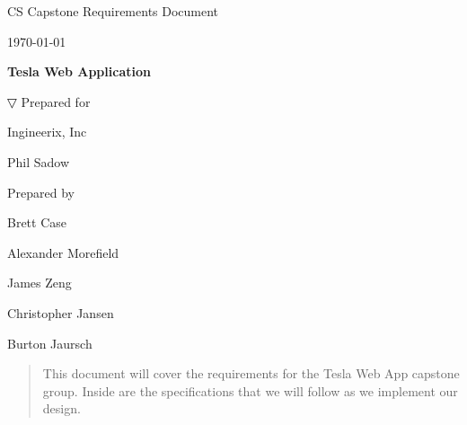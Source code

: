 \documentclass[onecolumn, draftclsnofoot,10pt, compsoc]{IEEEtran}
\def \CapstoneTeamName{                 The Ingineers}
\def \CapstoneTeamNumber{               22}
\def \GroupMemberOne{                   Brett Case}
\def \GroupMemberTwo{                   Alexander Morefield}
\def \GroupMemberThree{                 James Zeng}
\def \GroupMemberFour{                  Christopher Jansen}
\def \GroupMemberFive{                  Burton Jaursch}
\def \CapstoneProjectName{              Tesla Web Application}
\def \CapstoneSponsorCompany{           Ingineerix, Inc}
\def \CapstoneSponsorPerson{            Phil Sadow}
\def \DocType{                  %
                                Requirements Document
                                }
\newcommand{\NameSigPair}[1]{\par
\makebox[2.75in][r]{#1} \hfil   \makebox[3.25in]{\makebox[2.25in]{\hrulefill} \hfill            \makebox[.75in]{\hrulefill}}
\par\vspace{-12pt} \textit{\tiny\noindent
\makebox[2.75in]{} \hfil                \makebox[3.25in]{\makebox[2.25in][r]{Signature} \hfill  \makebox[.75in][r]{Date}}}}
\renewcommand{\NameSigPair}[1]{#1}
\begin{document}
\begin{titlepage}
    \begin{singlespace}
        \hfill
        \par\vspace{.2in}
        \centering
        \scshape{
            \huge CS Capstone \DocType \par
            {\large\today}\par
            \vspace{.5in}
            \textbf{\Huge\CapstoneProjectName}\par
            \vfill

▽
            \vfill
            {\large Prepared for}\par
            \Huge \CapstoneSponsorCompany\par
            \vspace{5pt}
            {\Large\NameSigPair{\CapstoneSponsorPerson}\par}
            {\large Prepared by }\par
            \vspace{5pt}
            {\Large
                \NameSigPair{\GroupMemberOne}\par
                \NameSigPair{\GroupMemberTwo}\par
                \NameSigPair{\GroupMemberThree}\par
                \NameSigPair{\GroupMemberFour}\par
                \NameSigPair{\GroupMemberFive}\par
            }
            \vspace{20pt}
        }
        \begin{abstract}
        This document will cover the requirements for the Tesla Web App capstone group. Inside are the specifications that we will follow as we implement our design.
        \end{abstract}
    \end{singlespace}
\end{titlepage}
\newpage
{}
\tableofcontents
\clearpage
\end{document}
